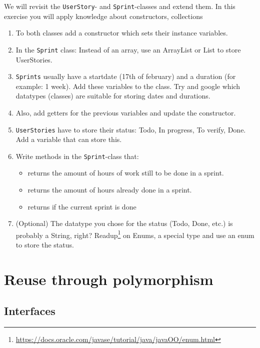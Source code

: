      We will revisit the \texttt{UserStory}- and \texttt{Sprint}-classes and extend them.
     In this exercise you will apply knowledge about constructors, collections
         \begin{enumerate}
             \item To both classes add a constructor which sets their instance variables.
             \item In the \texttt{Sprint} class: Instead of an array, use an ArrayList or List to store UserStories.
             \item \texttt{Sprints} usually have a startdate (17th of february) and a duration (for example: 1 week). Add these variables to the class. Try and google which datatypes (classes) are suitable for storing dates and durations.
             \item Also, add getters for the previous variables and update the constructor.
             \item \texttt{UserStories} have to store their status: Todo, In progress, To verify, Done. Add a variable that can store this.
             \item Write methods in the \texttt{Sprint}-class that:
             \begin{itemize}
                  \item returns the amount of hours of work still to be done in a sprint.
                  \item returns the amount of hours already done in a sprint.
                  \item returns if the current sprint is done
             \end{itemize}
             \item (Optional) The datatype you chose for the status (Todo, Done, etc.) is probably a String, right? Readup\footnote{\href{https://docs.oracle.com/javase/tutorial/java/javaOO/enum.html}{https://docs.oracle.com/javase/tutorial/java/javaOO/enum.html}} on Enums, a special type and use an enum to store the status.
         \end{enumerate}


\chapter{Reuse through polymorphism}

    \section{Interfaces}	    
